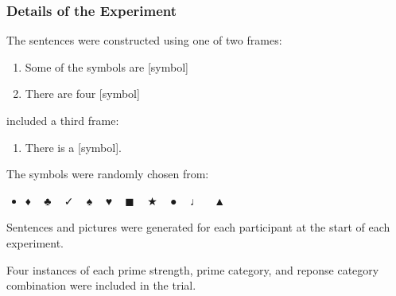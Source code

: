 \documentclass[noamssymb]{beamer}
\begin{document}
\begin{frame}
  \frametitle{{\ftf Details of the Experiment}}

The sentences were constructed using one of two frames:
\begin{enumerate}[label=(\roman*)]
\item Some of the symbols are [symbol]
\item There are four [symbol]
\end{enumerate}

\citeauthor{Bott:2016aa} included a third frame:
\begin{enumerate}[label=(\roman*), resume]
\item There is a [symbol].
\end{enumerate}

The symbols were randomly chosen from:
\begin{itemize}
\item  {\space\unifont ♦\space} \mbox{ }  {\space\unifont ♣\space} \mbox{ } {\space\unifont ✓\space} \mbox{ } {\space\unifont ♠\space} \mbox{ } {\space\unifont ♥\space} \mbox{ } {\space\unifont ◼\space} \mbox{ } {\space\unifont ★\space} \mbox{ } {\space\unifont ●\space} \mbox{ } {\space\unifont ♩\space} \mbox{ } {\space\unifont ▲}
\end{itemize}
Sentences and pictures were generated for each participant at the start of each experiment.

Four instances of each prime strength, prime category, and reponse category combination were included in the trial.
\end{frame}
\end{document}
